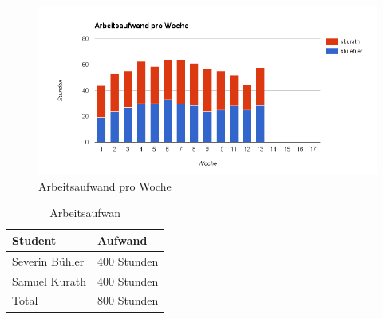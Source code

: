 \begin{figure}[H]
	\centering
	\includegraphics[width=480pt]{images/arbeits_aufwand_pro_woch.png}
	\caption{Arbeitsaufwand pro Woche}
\end{figure}

\begin{table}[H]
	\centering
    \begin{tabular}{|p{6cm}|p{6cm}|}
    \hline    
    \rowcolor{lightblue}
	Student & Aufwand \\ \hline   
	Severin Bühler & 400 Stunden \\ \hline
	Samuel Kurath & 400 Stunden \\ \hline
	\rowcolor{lightblue}
	Total & 800 Stunden \\ \hline
    \end{tabular}
    \caption[Arbeitsaufwan]{Arbeitsaufwan}
\end{table}

\newpage